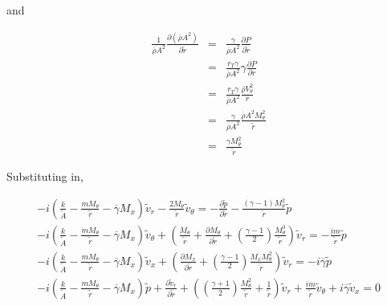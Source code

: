 \documentclass[12pt]{article}
\begin{document}
and

\begin{eqnarray}
\frac{1}{\overline{\rho} A^2}
\frac{\partial \left(\overline{\rho} A^2 \right) }{\partial \widetilde{r}} 
&=&
\frac{\gamma}{\overline{\rho} A^2}
 \frac{\partial P }{\partial \widetilde{r}}
\nonumber
\\
&=&
\frac{r_T \gamma}{\overline{\rho} A^2}
\gamma \frac{\partial P }{\partial r}
\nonumber
\\
&=&
\frac{r_T \gamma}{\overline{\rho} A^2}
\frac{\overline{\rho} V_{\theta}^2}{r}
\nonumber
\\
&=&
\frac{\gamma}{\overline{\rho} A^2}
\frac{\overline{\rho} A^2 M_{\theta}^2}{\widetilde{r}}
\nonumber
\\
&=&
\frac{\gamma M_{\theta}^2}{\widetilde{r}}
\nonumber
\end{eqnarray}

Substituting in,

\begin{small}
\begin{eqnarray}
-i
\left(
 \frac{k}{ \widetilde{A}}
- \frac{ m M_{\theta} }{\widetilde{r}}
- \overline{\gamma} M_x  
\right) \widetilde{v}_r 
-\frac{2 M_{\theta}}{\widetilde{r}} \widetilde{v}_{\theta} 
 = 
-
\frac{\partial \widetilde{p} }{\partial \widetilde{r}} 
-
\frac{\left(\gamma - 1 \right) M_{\theta}^2}{\widetilde{r}} \widetilde{p}
\nonumber
\\
-i
\left(
\frac{k}{\widetilde{A}}
- \frac{ m M_{\theta} }{\widetilde{r} }
- \overline{\gamma} M_x  
\right) \widetilde{v}_{\theta} 
+
\left(
\frac{M_{\theta} }{\widetilde{r}}
+
\frac{\partial M_{\theta} }{\partial \widetilde{r}}
+
\left(\frac{\gamma - 1}{2} \right) \frac{M_{\theta}^3}{\widetilde{r}}
\right) 
\widetilde{v}_r
 = 
-\frac{i m }{\widetilde{r} } \widetilde{p}
\nonumber
\\
-i
\left(
\frac{k}{\widetilde{A}}
- \frac{ m M_{\theta} }{\widetilde{r} }
- \overline{\gamma} M_x
\right) \widetilde{v}_x 
+
\left(
\frac{\partial M_x }{\partial \widetilde{r}} 
+
\left(\frac{\gamma - 1}{2} \right) \frac{M_x M_{\theta}^2}{\widetilde{r}}
\right)
\widetilde{v}_r
 = 
-i \overline{\gamma} \widetilde{p}
\nonumber
\\
-i
\left(
\frac{k}{\widetilde{A}}
- \frac{ m M_{\theta}}{\widetilde{r} } 
-  \overline{\gamma} M_x
\right) \widetilde{p}
+ 
\frac{\partial \widetilde{v}_r }{\partial \widetilde{r}}
+ 
\left(
\left(\frac{\gamma + 1}{2} \right) \frac{M_{\theta}^2}{\widetilde{r}}
+\frac{1 }{\widetilde{r}} 
\right)
\widetilde{v}_r
+\frac{i m }{\widetilde{r}} \widetilde{v}_{\theta} 
+ i \overline{\gamma} \widetilde{v}_x 
 = 
0
\nonumber
\end{eqnarray}
\end{small}%
\end{document}
